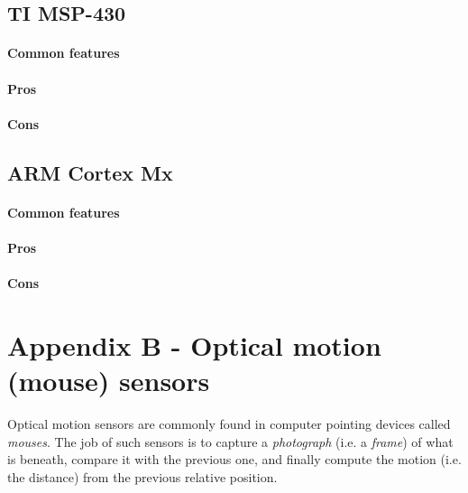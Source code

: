 \documentclass[a4paper,10pt]{article}
\begin{document}
\begin{multicols}{2}
\subsection{TI MSP-430}

\TODO


\paragraph{Common features}
\TODO


\paragraph{Pros}
\TODO


\paragraph{Cons}
\TODO


\subsection{ARM Cortex Mx}

\TODO


\paragraph{Common features}
\TODO


\paragraph{Pros}
\TODO


\paragraph{Cons}
\TODO


\section{Appendix B - Optical motion (mouse) sensors}

Optical motion sensors are commonly found in computer pointing devices called
\emph{mouses}. The job of such sensors is to capture a \emph{photograph}
(i.e. a \emph{frame}) of what is beneath, compare it with the previous one,
and finally compute the motion (i.e. the distance) from the previous relative
position.


\end{multicols}
\end{document}
